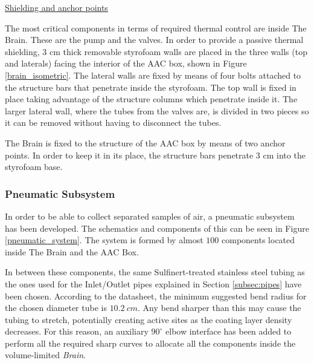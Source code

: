 
\bigskip
\underline{Shielding and anchor points}

\smallskip
The most critical components in terms of required thermal control are inside The Brain. These are the pump and the valves. In order to provide a passive thermal shielding, 3 cm thick removable styrofoam walls are placed in the three walls (top and laterals) facing the interior of the AAC box, shown in Figure \ref{brain_isometric}. The lateral walls are fixed by means of four bolts attached to the structure bars that penetrate inside the styrofoam. The top wall is fixed in place taking advantage of the structure columns which penetrate inside it. The larger lateral wall, where the tubes from the valves are, is divided in two pieces so it can be removed without having to disconnect the tubes. 

\smallskip
The Brain is fixed to the structure of the AAC box by means of two anchor points. In order to keep it in its place, the structure bars penetrate 3 cm into the styrofoam base.


\subsubsection{Pneumatic Subsystem}
\label{sec:4.4.5}

In order to be able to collect separated samples of air, a pneumatic subsystem has been developed. The schematics and components of this can be seen in Figure \ref{pneumatic_system}. The system is formed by almost $100$ components located inside The Brain and the AAC Box. 

In between these components, the same Sulfinert-treated stainless steel tubing as the ones used for the Inlet/Outlet pipes explained in Section \ref{subsec:pipes} have been chosen. According to the datasheet, the minimum suggested bend radius for the chosen diameter tube is $10.2\ cm$. Any bend sharper than this may cause the tubing to stretch, potentially creating active sites as the coating layer density decreases. For this reason, an auxiliary $90^\circ$ elbow interface has been added to perform all the required sharp curves to allocate all the components inside the volume-limited \emph{Brain}.


